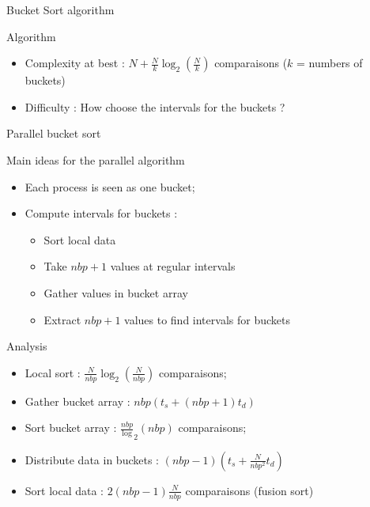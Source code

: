 \documentclass[compress,10pt,aspectratio=169]{beamer}
\begin{document}
\begin{frame}[fragile]{Bucket Sort algorithm}
\begin{block}{Algorithm}
\begin{figure}
\end{figure}
\begin{itemize}
    \item Complexity at best : $N + \frac{N}{k}\log_{2}(\frac{N}{k})$ comparaisons ($k$ = numbers of buckets)
    \item \alert{Difficulty} : How choose the intervals for the buckets ?
\end{itemize}
\end{block}

\end{frame}

\begin{frame}[fragile]{Parallel bucket sort}
    \scriptsize
    \begin{multicols}{2}
    \begin{block}{\small Main ideas for the parallel algorithm}
        \begin{itemize}
            \item Each process is seen as one bucket;
            \item Compute intervals for buckets :
            \begin{itemize}
                \item {\scriptsize Sort local data}
                \item {\scriptsize Take $nbp+1$ values at regular intervals}
                \item {\scriptsize Gather values in bucket array}
                \item {\scriptsize Extract $nbp+1$ values to find intervals for buckets}
            \end{itemize}
        \end{itemize}
    \end{block}

    \begin{exampleblock}{\small Analysis}
        \begin{itemize}
            \item Local sort : $\frac{N}{nbp}\log_{2}(\frac{N}{nbp})$ comparaisons;
            \item Gather bucket array : $nbp(t_{s} + (nbp+1)t_{d})$
            \item Sort bucket array : $\frac{nbp}\log_{2}(nbp)$ comparaisons;
            \item Distribute data in buckets : $(nbp-1)\left(t_{s} + \frac{N}{nbp^{2}}t_{d}\right)$
            \item Sort local data : $2(nbp-1)\frac{N}{nbp}$ comparaisons (fusion sort)
        \end{itemize}
    \end{exampleblock}
\end{multicols}
\end{frame}
\end{document}
